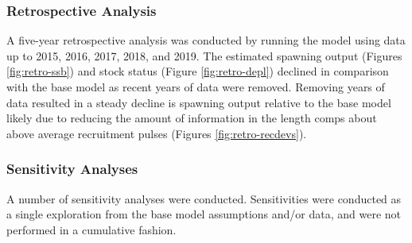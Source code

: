 \documentclass[11pt,
  english,
  letterpaper,
]{article}
\begin{document}
\leavevmode\tagmcend\tagstructend\par


\hypertarget{retrospective-analysis}{%
\subsubsection{Retrospective Analysis}\label{retrospective-analysis}}

\leavevmode\tagmcend\tagstructend


A five-year retrospective analysis was conducted by running the model using data up to 2015, 2016, 2017, 2018, and 2019. The estimated spawning output (Figures \ref{fig:retro-ssb}) and stock status (Figure \ref{fig:retro-depl}) declined in comparison with the base model as recent years of data were removed. Removing years of data resulted in a steady decline is spawning output relative to the base model likely due to reducing the amount of information in the length comps about above average recruitment pulses (Figures \ref{fig:retro-recdevs}).

\leavevmode\tagmcend\tagstructend\par


\hypertarget{sensitivity-analyses}{%
\subsubsection{Sensitivity Analyses}\label{sensitivity-analyses}}

\leavevmode\tagmcend\tagstructend


A number of sensitivity analyses were conducted. Sensitivities were conducted as a single exploration from the base model assumptions and/or data, and were not performed in a cumulative fashion.

\leavevmode\tagmcend\tagstructend\par
\end{document}
